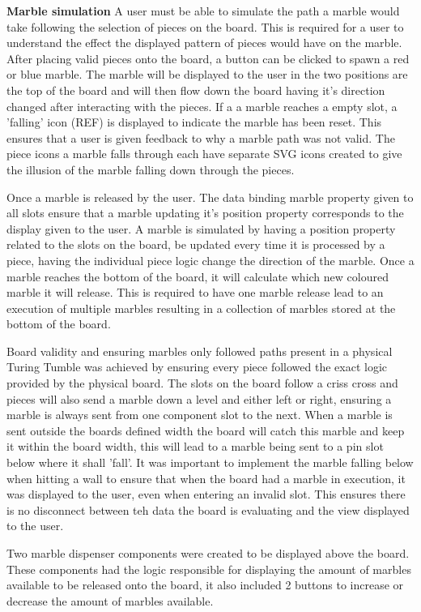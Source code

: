 \documentclass{l4proj}
\begin{document}
\textbf{Marble simulation}
A user must be able to simulate the path a marble would take following the selection of pieces on the board. This is required for a user to understand the effect the displayed pattern of pieces would have on the marble. After placing valid pieces onto the board, a button can be clicked to spawn a red or blue marble. The marble will be displayed to the user in the two positions are the top of the board and will then flow down the board having it's direction changed after interacting with the pieces. If a a marble reaches a empty slot, a 'falling' icon (REF) is displayed to indicate the marble has been reset. This ensures that a user is given feedback to why a marble path was not valid. The piece icons a marble falls through each have separate SVG icons created to give the illusion of the marble falling down through the pieces.

Once a marble is released by the user. The data binding marble property given to all slots ensure that a marble updating it's position property corresponds to the display given to the user. A marble is simulated by having a position property related to the slots on the board, be updated every time it is processed by a piece, having the individual piece logic change the direction of the marble. Once a marble reaches the bottom of the board, it will calculate which new coloured marble it will release. This is required to have one marble release lead to an execution of multiple marbles resulting in a collection of marbles stored at the bottom of the board. 

Board validity and ensuring marbles only followed paths present in a physical Turing Tumble was achieved by ensuring every piece followed the exact logic provided by the physical board. The slots on the board follow a criss cross and pieces will also send a marble down a level and either left or right, ensuring a marble is always sent from one component slot to the next. When a marble is sent outside the boards defined width the board will catch this marble and keep it within the board width, this will lead to a marble being sent to a pin slot below where it shall 'fall'. It was important to implement the marble falling below when hitting a wall to ensure that when the board had a marble in execution, it was displayed to the user, even when entering an invalid slot. This ensures there is no disconnect between teh data the board is evaluating and the view displayed to the user.

Two marble dispenser components were created to be displayed above the board. These components had the logic responsible for displaying the amount of marbles available to be released onto the board, it also included 2 buttons to increase or decrease the amount of marbles available. 
\end{document}

